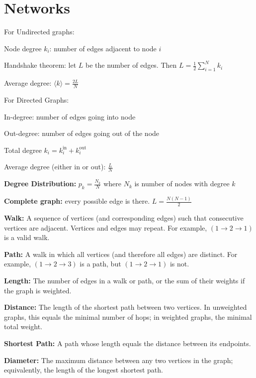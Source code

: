 \section*{Networks}

For Undirected graphs:
\begin{tightitemize}
    \item Node degree $k_i$: number of edges adjacent to 
    node $i$
    \item Handshake theorem: let $L$ be the number of edges.
    Then $L = \frac{1}{2}\sum_{i=1}^{N}k_i$
    \item Average degree: $\langle k \rangle = \frac{2L}{N}$
\end{tightitemize}

For Directed Graphs:
\begin{tightitemize}
    \item In-degree: number of edges going into node 
    \item Out-degree: number of edges going out of the node 
    \item Total degree $k_i = k_i^\text{in} + k_i^\text{out}$
    \item Average degree (either in or out): $\frac{L}{N}$
\end{tightitemize}

\textbf{Degree Distribution:} $p_k = \frac{N_k}{N}$ where $N_k$ is number of 
nodes with degree $k$

\textbf{Complete graph:} every possible edge is there. $L = \frac{N(N-1)}{2}$

\begin{tightitemize}
    \item \textbf{Walk:} A sequence of vertices (and corresponding edges) such that consecutive vertices are adjacent. 
    Vertices and edges may repeat. For example, $(1 \to 2 \to 1)$ is a valid walk.

    \item \textbf{Path:} A walk in which all vertices (and therefore all edges) are distinct. 
    For example, $(1 \to 2 \to 3)$ is a path, but $(1 \to 2 \to 1)$ is not.

    \item \textbf{Length:} The number of edges in a walk or path, or the sum of their weights if the graph is weighted.

    \item \textbf{Distance:} The length of the shortest path between two vertices. 
    In unweighted graphs, this equals the minimal number of hops; in weighted graphs, the minimal total weight.

    \item \textbf{Shortest Path:} A path whose length equals the distance between its endpoints.

    \item \textbf{Diameter:} The maximum distance between any two vertices in the graph; equivalently, 
    the length of the longest shortest path.
\end{tightitemize}


